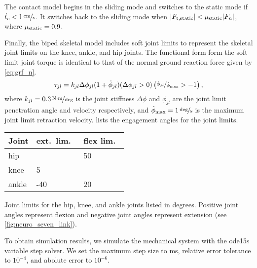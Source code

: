 The contact model begins in the sliding mode and switches to the static mode if
$\dot t_c < \unitfrac[1]{cm}{s}$. It switches back to the sliding mode when $|
F_{\textnormal{t,static}} | < \mu_{\textnormal{static}} | F_n |$, where $\mu_{\textnormal{static}} = 0.9$.

Finally, the biped skeletal model includes soft joint limits to represent
the skeletal joint limits on the knee, ankle, and hip joints. The functional
form form the soft limit joint torque is identical to that of the normal ground
reaction force given by \cref{eq:grf_n}.
\begin{align}
    \tau_{jl} = k_{jl} \Delta \phi_{jl} (1 + \dot \phi_{jl}) (\Delta
    \phi_{jl}  > 0) \left(\nicefrac{\dot \phi_{jl}}{\dot \phi_{\textnormal{max}}} > -1
    \right), 
    \label{eq:tau_joint_limit}
\end{align}
where $k_{jl} = \unitfrac[0.3]{N \cdot m}{deg}$ is the joint stiffness $\Delta
\phi$ and $\dot \phi_{jl}$ are the joint limit penetration angle and
velocity respectively, and $\dot \phi_\tn{max} = \unitfrac[1]{deg}{s}$ is the
maximum joint limit retraction velocity.  lists the
engagement angles for the joint limits.
\begin{margintable}[-0.65in]
  \centering
      \begin{tabular}{lll}
        \toprule
        Joint & ext.\ lim.\ & flex lim.\ \\
        \midrule
        hip   &     & 50 \\
        knee  &   5 &    \\
        ankle & -40 & 20 \\
        \bottomrule
      \end{tabular}
  \caption{Joint limits for the hip, knee, and ankle joints listed in degrees.
  Positive joint angles represent flexion and negative joint angles represent
  extension (see \cref{fig:neuro_seven_link}).}\label{tab:joint_lim}
\end{margintable}

To obtain simulation results, we simulate the mechanical system with the ode15s
variable step solver. We set the maximum step size to \unit[10]{ms}, relative
error tolerance to $10^{-4}$, and abolute error to $10^{-6}$.

